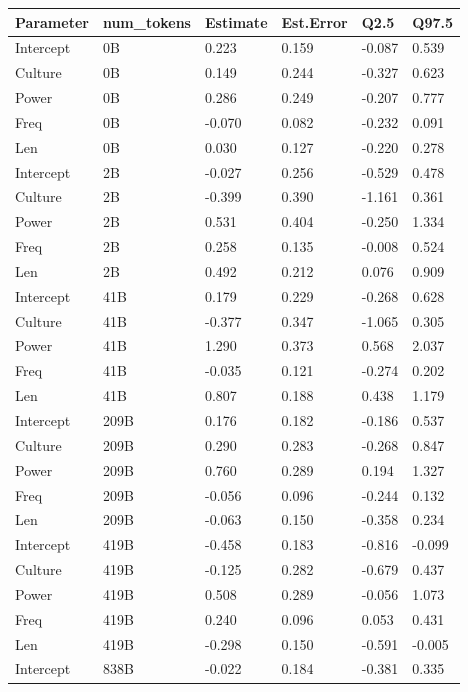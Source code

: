 \documentclass[
  nottoc]{article}
\begin{document}
\begin{longtable}[]{@{}llllll@{}}

\toprule\noalign{}
Parameter & num\_tokens & Estimate & Est.Error & Q2.5 & Q97.5 \\
\midrule\noalign{}
\endhead
\bottomrule\noalign{}
\endlastfoot
Intercept & 0B & 0.223 & 0.159 & -0.087 & 0.539 \\
Culture & 0B & 0.149 & 0.244 & -0.327 & 0.623 \\
Power & 0B & 0.286 & 0.249 & -0.207 & 0.777 \\
Freq & 0B & -0.070 & 0.082 & -0.232 & 0.091 \\
Len & 0B & 0.030 & 0.127 & -0.220 & 0.278 \\
Intercept & 2B & -0.027 & 0.256 & -0.529 & 0.478 \\
Culture & 2B & -0.399 & 0.390 & -1.161 & 0.361 \\
Power & 2B & 0.531 & 0.404 & -0.250 & 1.334 \\
Freq & 2B & 0.258 & 0.135 & -0.008 & 0.524 \\
Len & 2B & 0.492 & 0.212 & 0.076 & 0.909 \\
Intercept & 41B & 0.179 & 0.229 & -0.268 & 0.628 \\
Culture & 41B & -0.377 & 0.347 & -1.065 & 0.305 \\
Power & 41B & 1.290 & 0.373 & 0.568 & 2.037 \\
Freq & 41B & -0.035 & 0.121 & -0.274 & 0.202 \\
Len & 41B & 0.807 & 0.188 & 0.438 & 1.179 \\
Intercept & 209B & 0.176 & 0.182 & -0.186 & 0.537 \\
Culture & 209B & 0.290 & 0.283 & -0.268 & 0.847 \\
Power & 209B & 0.760 & 0.289 & 0.194 & 1.327 \\
Freq & 209B & -0.056 & 0.096 & -0.244 & 0.132 \\
Len & 209B & -0.063 & 0.150 & -0.358 & 0.234 \\
Intercept & 419B & -0.458 & 0.183 & -0.816 & -0.099 \\
Culture & 419B & -0.125 & 0.282 & -0.679 & 0.437 \\
Power & 419B & 0.508 & 0.289 & -0.056 & 1.073 \\
Freq & 419B & 0.240 & 0.096 & 0.053 & 0.431 \\
Len & 419B & -0.298 & 0.150 & -0.591 & -0.005 \\
Intercept & 838B & -0.022 & 0.184 & -0.381 & 0.335 \\

\end{longtable}
\end{document}
